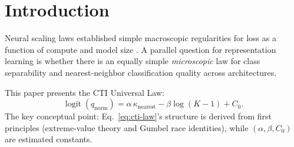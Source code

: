 \documentclass{article}
\DeclareMathOperator{\logit}{logit}
\begin{document}
\section{Introduction}
Neural scaling laws established simple macroscopic regularities for loss as a function of compute and model size \citep{kaplan2020,hoffmann2022}. A parallel question for representation learning is whether there is an equally simple \emph{microscopic} law for class separability and nearest-neighbor classification quality across architectures.

This paper presents the CTI Universal Law:
\begin{equation}
\label{eq:cti-law}
\logit(q_{\mathrm{norm}})=\alpha\,\kappa_{\mathrm{nearest}}-\beta\log(K-1)+C_0.
\end{equation}
The key conceptual point: Eq.~\ref{eq:cti-law}'s structure is derived from first principles (extreme-value theory and Gumbel race identities), while $(\alpha,\beta,C_0)$ are estimated constants.
\end{document}
